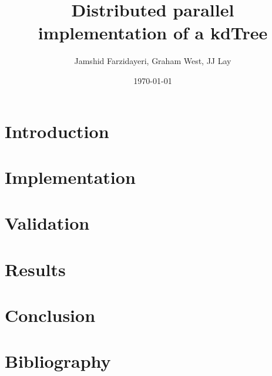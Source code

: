 \documentclass{article}
\title{Distributed parallel implementation of a kdTree}
\author{Jamshid Farzidayeri, Graham West, JJ Lay}
\date{\today}
\begin{document}
\maketitle


\section{Introduction}


\section{Implementation}


\section{Validation}


\section{Results}


\section{Conclusion}



\section{Bibliography}
\end{document}
